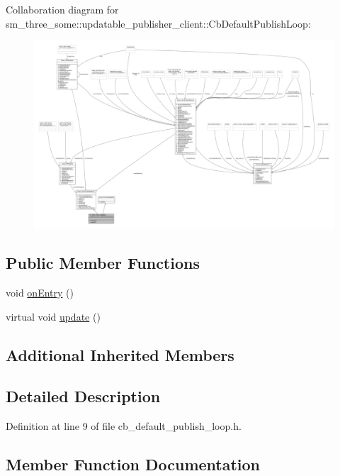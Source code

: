 Collaboration diagram for sm\+\_\+three\+\_\+some\+:\+:updatable\+\_\+publisher\+\_\+client\+:\+:Cb\+Default\+Publish\+Loop\+:
\nopagebreak
\begin{figure}[H]
\begin{center}
\leavevmode
\includegraphics[width=350pt]{classsm__three__some_1_1updatable__publisher__client_1_1CbDefaultPublishLoop__coll__graph}
\end{center}
\end{figure}
\subsection*{Public Member Functions}
\begin{DoxyCompactItemize}
\item 
void \hyperlink{classsm__three__some_1_1updatable__publisher__client_1_1CbDefaultPublishLoop_aa6625d9937e5d043f7a34ad9a368db15}{on\+Entry} ()
\item 
virtual void \hyperlink{classsm__three__some_1_1updatable__publisher__client_1_1CbDefaultPublishLoop_a7ac1f7ddb2eb6f96acff7eed19754ae7}{update} ()
\end{DoxyCompactItemize}
\subsection*{Additional Inherited Members}


\subsection{Detailed Description}


Definition at line 9 of file cb\+\_\+default\+\_\+publish\+\_\+loop.\+h.



\subsection{Member Function Documentation}
